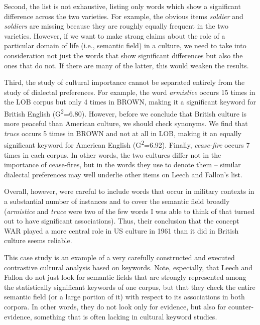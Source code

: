 Second, the list is not exhaustive, listing only words which show a significant difference across the two varieties.  For example, the obvious items \textit{soldier} and \textit{soldiers} are missing because they are roughly equally frequent in the two varieties. However, if we want to make strong claims about the role of a particular domain of life (i.e., semantic  field) in a culture,  we need to take into consideration not just the words that show significant differences but also the ones that do not. If there are many of the latter, this would weaken the results.

Third, the study of cultural  importance cannot be separated entirely from the study of dialectal preferences. For example, the word \textit{armistice} occurs 15 times in the LOB  corpus but only 4 times in BROWN,  making it a significant keyword  for British  English (\textsc{G}\textsc{\textsuperscript{2}}=6.80). However, before we conclude that British culture is more peaceful than American  culture,  we should check synonyms.  We find that \textit{truce} occurs 5 times in BROWN  and not at all in LOB,  making it an equally significant keyword for American English (\textsc{G}\textsc{\textsuperscript{2}}=6.92). Finally, \textit{cease\hyp{}fire} occurs 7 times in each corpus. In other words, the two cultures  differ not in the importance of cease\hyp{}fires, but in the words they use to denote them -- similar dialectal preferences may well underlie other items on Leech and Fallon's list.

Overall, however, \citet{leech_computer_1992} were careful to include words that occur in military contexts in a substantial number of instances and to cover the semantic  field broadly (\textit{armistice} and \textit{truce} were two of the few words I was able to think of that turned out to have significant associations).  Thus, their conclusion that the concept WAR played a more central role in US culture  in 1961 than it did in British culture seems reliable.

This case study is an example of a very carefully constructed and executed contrastive cultural  analysis based on keywords.  Note, especially, that Leech and Fallon do not just look for semantic  fields that are strongly represented among the statistically significant keywords of one corpus, but that they check the entire semantic field (or a large portion of it) with respect to its associations  in both corpora. In other words, they do not look only for evidence, but also for counter\hyp{}evidence, something that is often lacking in cultural  keyword  studies.

